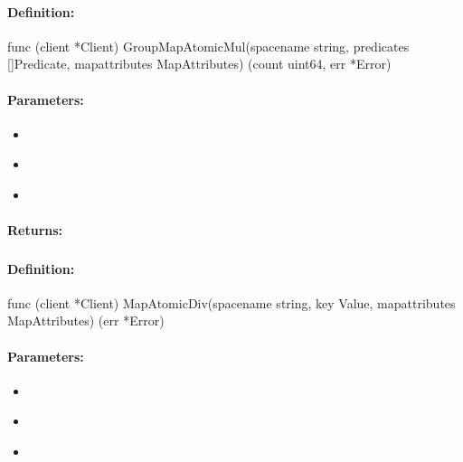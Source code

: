 \paragraph{Definition:}
\begin{gocode}
func (client *Client) GroupMapAtomicMul(spacename string, predicates []Predicate, mapattributes MapAttributes) (count uint64, err *Error)
\end{gocode}

\paragraph{Parameters:}
\begin{itemize}[noitemsep]
\item {}\\

\item {}\\

\item {}\\

\end{itemize}

\paragraph{Returns:}


\pagebreak
\subsubsection{}
\label{api:Go:MapAtomicDiv}


\paragraph{Definition:}
\begin{gocode}
func (client *Client) MapAtomicDiv(spacename string, key Value, mapattributes MapAttributes) (err *Error)
\end{gocode}

\paragraph{Parameters:}
\begin{itemize}[noitemsep]
\item {}\\

\item {}\\

\item {}\\

\end{itemize}

